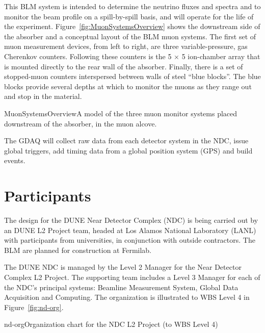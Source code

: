 This BLM system is intended to determine the neutrino fluxes and spectra
and to monitor the beam profile on a spill-by-spill basis, and will operate for the life of the
experiment. 
Figure~\ref{fig:MuonSystemsOverview} shows the downstream side of the absorber and a conceptual 
layout of the BLM muon systems.
The first set 
of muon measurement devices, from  left to right, are three
variable-pressure, gas Cherenkov counters. Following these counters 
is the 5 $\times$ 5 ion-chamber array that is
 mounted directly to the rear wall of the absorber. 
Finally, there is a set of stopped-muon counters 
 interspersed between walls of steel ``blue blocks''. The blue blocks 
provide several
 depths at which to monitor the muons as they range out and stop 
in the material.

\begin{cdrfigure}{MuonSystemsOverview}{A model of the three muon monitor systems placed downstream of the absorber, in the muon alcove.}
\end{cdrfigure}

The GDAQ will collect raw data from each
detector system in the NDC, issue global triggers, add timing data
from a global position system (GPS) and build events.


\section{Participants}

The design for the DUNE Near Detector Complex (NDC) is being carried out by an DUNE L2 Project team, headed at Los Alamos National Laboratory (LANL) 
with participants from universities, in conjunction with outside contractors.  
The BLM are planned for construction at 
Fermilab.

The DUNE NDC is managed by the 
Level 2 Manager for the Near Detector Complex L2 Project. The supporting team 
includes a Level 3 
Manager for each of the NDC's principal systems: Beamline Measurement System, Global Data Acquisition and Computing. The organization is illustrated to WBS Level 4 in Figure~\ref{fig:nd-org}.

\begin{cdrfigure}{nd-org}{Organization chart for the NDC L2 Project (to WBS Level 4)}
\end{cdrfigure}

